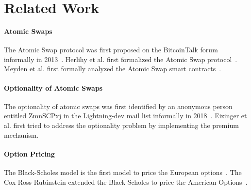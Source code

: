 \section{Related Work}
\label{sec:related_work}

\paragraph{Atomic Swaps}
The Atomic Swap protocol was first proposed on the BitcoinTalk forum informally in 2013~\cite{nolan2013alt}.
Herlihy et al. first formalized the Atomic Swap protocol~\cite{herlihy2018atomic}.
Meyden et al. first formally analyzed the Atomic Swap smart contracts~\cite{van2018specification}.

\paragraph{Optionality of Atomic Swaps}
The optionality of atomic swaps was first identified by an anonymous person entitled ZmnSCPxj in the Lightning-dev mail list informally in 2018~\cite{optionality-origin}.
Eizinger et al. first tried to address the optionality problem by implementing the premium mechanism\cite{first-attempt-optionality}.

\paragraph{Option Pricing}
The Black-Scholes model is the first model to price the European options~\cite{black1973pricing}.
The Cox-Ross-Rubinstein extended the Black-Scholes to price the American Options~\cite{cox1979option}.